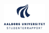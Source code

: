 \clearpage
\thispagestyle{empty}

\begin{figure}[H]
	\raggedleft
		\includegraphics[width=0.2\textwidth]{figures/aaulogo-da.png}
\end{figure}



